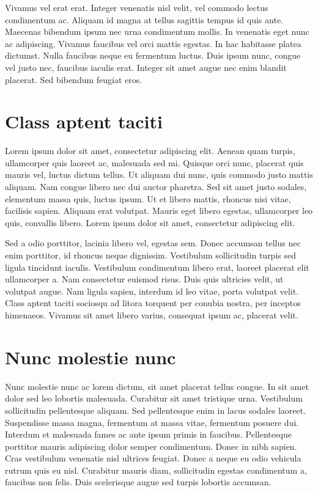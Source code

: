\documentclass[xindy,acronym,symbols]{fei}
\begin{document}
Vivamus vel erat erat. Integer venenatis nisl velit, vel commodo lectus condimentum ac. Aliquam id magna at tellus sagittis tempus id quis ante. Maecenas bibendum ipsum nec urna condimentum mollis. In venenatis eget nunc ac adipiscing. Vivamus faucibus vel orci mattis egestas. In hac habitasse platea dictumst. Nulla faucibus neque eu fermentum luctus. Duis ipsum nunc, congue vel justo nec, faucibus iaculis erat. Integer sit amet augue nec enim blandit placerat. Sed bibendum feugiat eros.

\section{Class aptent taciti}

Lorem ipsum dolor sit amet, consectetur adipiscing elit. Aenean quam turpis, ullamcorper quis laoreet ac, malesuada sed mi. Quisque orci nunc, placerat quis mauris vel, luctus dictum tellus. Ut aliquam dui nunc, quis commodo justo mattis aliquam. Nam congue libero nec dui auctor pharetra. Sed sit amet justo sodales, elementum massa quis, luctus ipsum. Ut et libero mattis, rhoncus nisi vitae, facilisis sapien. Aliquam erat volutpat. Mauris eget libero egestas, ullamcorper leo quis, convallis libero. Lorem ipsum dolor sit amet, consectetur adipiscing elit.

Sed a odio porttitor, lacinia libero vel, egestas sem. Donec accumsan tellus nec enim porttitor, id rhoncus neque dignissim. Vestibulum sollicitudin turpis sed ligula tincidunt iaculis. Vestibulum condimentum libero erat, laoreet placerat elit ullamcorper a. Nam consectetur euismod risus. Duis quis ultricies velit, ut volutpat augue. Nam ligula sapien, interdum id leo vitae, porta volutpat velit. Class aptent taciti sociosqu ad litora torquent per conubia nostra, per inceptos himenaeos. Vivamus sit amet libero varius, consequat ipsum ac, placerat velit.

\section{Nunc molestie nunc}

Nunc molestie nunc ac lorem dictum, sit amet placerat tellus congue. In sit amet dolor sed leo lobortis malesuada. Curabitur sit amet tristique urna. Vestibulum sollicitudin pellentesque aliquam. Sed pellentesque enim in lacus sodales laoreet. Suspendisse massa magna, fermentum at massa vitae, fermentum posuere dui. Interdum et malesuada fames ac ante ipsum primis in faucibus. Pellentesque porttitor mauris adipiscing dolor semper condimentum. Donec in nibh sapien. Cras vestibulum venenatis nisl ultrices feugiat. Donec a neque eu odio vehicula rutrum quis eu nisl. Curabitur mauris diam, sollicitudin egestas condimentum a, faucibus non felis. Duis scelerisque augue sed turpis lobortis accumsan.
\end{document}
